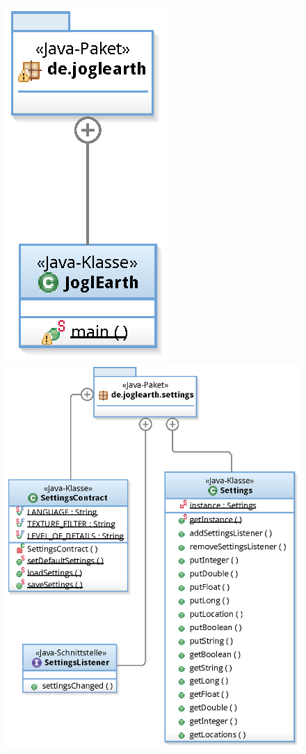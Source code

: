 \documentclass[10pt]{scrreprt}
\begin{document}
\begin{figure}[!htb]
	\centering
		\begin{minipage}[c]{3cm}
        \centering
			\includegraphics[scale=0.55]{de_joglearth.eps}
        \end{minipage}
        \hspace{2cm}
        \begin{minipage}[c]{6cm}
        \centering
			\includegraphics[scale=0.55]{de_joglearth_settings.eps}

\end{minipage}
\end{figure}
\end{document}
